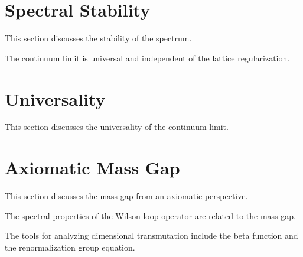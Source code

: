 \section{Spectral Stability}
\label{sec:spectral-stability}
This section discusses the stability of the spectrum.

\begin{theorem}[Universality]
\label{thm:universality}
The continuum limit is universal and independent of the lattice regularization.
\end{theorem}

\section{Universality}
\label{sec:universality}
This section discusses the universality of the continuum limit.

\section{Axiomatic Mass Gap}
\label{sec:axiomatic-mass-gap}
This section discusses the mass gap from an axiomatic perspective.

\begin{theorem}
\label{thm:spectral-wilson}
The spectral properties of the Wilson loop operator are related to the mass gap.
\end{theorem}

\begin{theorem}
\label{thm:dimensional-transmutation-tools}
The tools for analyzing dimensional transmutation include the beta function and the renormalization group equation.
\end{theorem}



